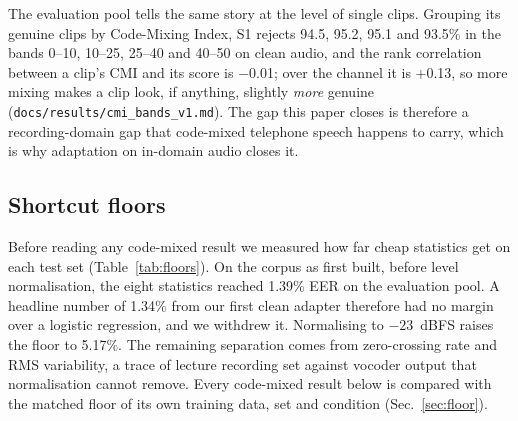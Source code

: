 \begin{table}[t]
\centering
\caption{False alarms (\%) on the language-controlled genuine set: 183 unseen speakers,
each in three language conditions from the same recordings. Last column: within-speaker
difference mixed $-$ English (points), 95\% speaker-bootstrap interval.}
\label{tab:language}
\small
{}
\end{table}

The evaluation pool tells the same story at the level of single clips. Grouping its
genuine clips by Code-Mixing Index, S1 rejects 94.5, 95.2, 95.1 and 93.5\% in the
bands 0--10, 10--25, 25--40 and 40--50 on clean audio, and the rank correlation
between a clip's CMI and its score is $-$0.01; over the channel it is +0.13, so more
mixing makes a clip look, if anything, slightly \emph{more} genuine
(\texttt{docs/results/cmi\_bands\_v1.md}). The gap this paper closes is therefore a
recording-domain gap that code-mixed telephone speech happens to carry, which is why
adaptation on in-domain audio closes it.

\subsection{Shortcut floors}
\label{sec:floors}

Before reading any code-mixed result we measured how far cheap statistics get on
each test set (Table~\ref{tab:floors}). On the corpus as first built, before level
normalisation, the eight statistics reached 1.39\% EER on the evaluation pool. A
headline number of 1.34\% from our first clean adapter therefore had no margin over
a logistic regression, and we withdrew it. Normalising to $-23$~dBFS raises the
floor to 5.17\%. The remaining separation comes from zero-crossing rate and RMS
variability, a trace of lecture recording set against vocoder output that
normalisation cannot remove. Every code-mixed result below is compared with the
matched floor of its own training data, set and condition (Sec.~\ref{sec:floor}).

